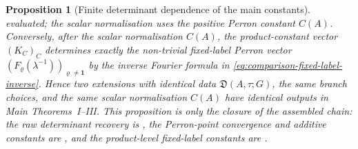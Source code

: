 \documentclass[11pt,a4paper]{amsart}
\theoremstyle{plain}
\newtheorem{proposition}[theorem]{Proposition}
\theoremstyle{definition}
\theoremstyle{remark}
\begin{document}
\begin{proposition}[Finite determinant dependence of the main constants]
  evaluated; the scalar normalisation uses the positive Perron constant
  \(C(A)\).  Conversely, after the scalar normalisation
  \(C(A)\), the product-constant vector \((K_C)_C\) determines exactly the
  non-trivial fixed-label Perron vector
  \((F_\varrho(\lambda^{-1}))_{\varrho\ne\mathbf1}\) by the inverse
  Fourier formula in \eqref{eq:comparison-fixed-label-inverse}.
  Hence two extensions with identical data \(\mathfrak D(A,\tau;G)\), the
  same branch choices, and the same scalar normalisation \(C(A)\) have
  identical outputs in Main Theorems~I--III.  This proposition is only the
  closure of the assembled chain: the raw determinant recovery is
  ,
  the Perron-point convergence and additive constants are
  , and the
  product-level fixed-label constants are
  .
\end{proposition}
\end{document}

